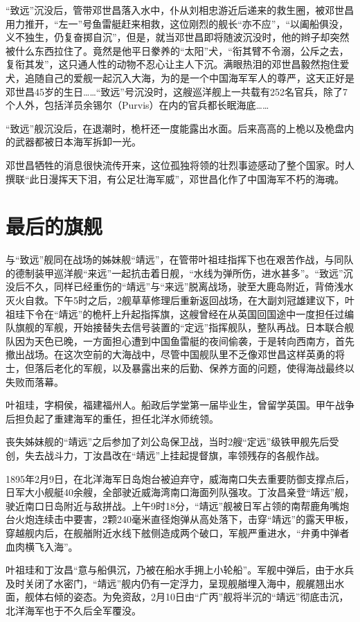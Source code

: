 \documentclass[12pt,UTF8]{ctexbook}
\begin{document}
“致远”沉没后，管带邓世昌落入水中，仆从刘相忠游近后递来的救生圈，被邓世昌用力推开，“左一”号鱼雷艇赶来相救，这位刚烈的舰长“亦不应”，“以阖船俱没，义不独生，仍复奋掷自沉”，但是，就当邓世昌即将随波沉没时，他的辫子却突然被什么东西拉住了。竟然是他平日豢养的“太阳”犬，“衔其臂不令溺，公斥之去，复衔其发”，这只通人性的动物不忍心让主人下沉。满眼热泪的邓世昌毅然抱住爱犬，追随自己的爱舰一起沉入大海，为的是一个中国海军军人的尊严，这天正好是邓世昌45岁的生日……“致远”号沉没时，这艘巡洋舰上一共载有252名官兵，除了7个人外，包括洋员余锡尔（Purvis）在内的官兵都长眠海底……

“致远”舰沉没后，在退潮时，桅杆还一度能露出水面。后来高高的上桅以及桅盘内的武器都被日本海军拆卸一光。

邓世昌牺牲的消息很快流传开来，这位孤独将领的壮烈事迹感动了整个国家。时人撰联“此日漫挥天下泪，有公足壮海军威”，邓世昌化作了中国海军不朽的海魂。

\section{最后的旗舰}

与“致远”舰同在战场的姊妹舰“靖远”，在管带叶祖珪指挥下也在艰苦作战，与同队的德制装甲巡洋舰“来远”一起抗击着日舰，“水线为弹所伤，进水甚多”。“致远”沉没后不久，同样已经重伤的“靖远”与“来远”脱离战场，驶至大鹿岛附近，背倚浅水灭火自救。下午5时之后，2舰草草修理后重新返回战场，在大副刘冠雄建议下，叶祖珪下令在“靖远”的桅杆上升起指挥旗，这艘曾经在从英国回国途中一度担任过编队旗舰的军舰，开始接替失去信号装置的“定远”指挥舰队，整队再战。日本联合舰队因为天色已晚，一方面担心遭到中国鱼雷艇的夜间偷袭，于是转向西南方，首先撤出战场。在这次空前的大海战中，尽管中国舰队里不乏像邓世昌这样英勇的将士，但落后老化的军舰，以及暴露出来的后勤、保养方面的问题，使得海战最终以失败而落幕。

叶祖珪，字桐侯，福建福州人。船政后学堂第一届毕业生，曾留学英国。甲午战争后担负起了重建海军的重任，担任北洋水师统领。

丧失姊妹舰的“靖远”之后参加了刘公岛保卫战，当时2艘“定远”级铁甲舰先后受创，失去战斗力，丁汝昌改在“靖远”上挂起提督旗，率领残存的各舰作战。

1895年2月9日，在北洋海军日岛炮台被迫弃守，威海南口失去重要防御支撑点后，日军大小舰艇40余艘，全部驶近威海湾南口海面列队强攻。丁汝昌亲登“靖远”舰，驶近南口日岛附近与敌拼战。上午9时18分，“靖远”舰被日军占领的南帮鹿角嘴炮台火炮连续击中要害，2颗240毫米直径炮弹从高处落下，击穿“靖远”的露天甲板，穿越舰内后，在舰艏附近水线下舷侧造成两个破口，军舰严重进水，“弁勇中弹者血肉横飞入海”。

叶祖珪和丁汝昌“意与船俱沉，乃被在船水手拥上小轮船”。军舰中弹后，由于水兵及时关闭了水密门，“靖远”舰内仍有一定浮力，呈现舰艏埋入海中，舰艉翘出水面，舰体右倾的姿态。为免资敌，2月10日由“广丙”舰将半沉的“靖远”彻底击沉，北洋海军也于不久后全军覆没。
\end{document}
